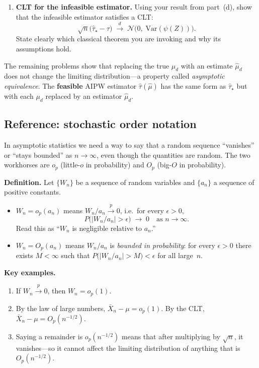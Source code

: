 \documentclass{article}
\newcommand{\Var}{\mathrm{Var}}
\newcommand{\op}{o_p}
\newcommand{\pconv}{\xrightarrow{p}}
\newcommand{\dconv}{\xrightarrow{d}}
\theoremstyle{definition}
\begin{document}
\begin{enumerate}
\begin{enumerate}
\item \textbf{CLT for the infeasible estimator.}
Using your result from part~(d), show that the infeasible estimator satisfies a CLT:
\[
  \sqrt{n}\bigl(\widehat{\tau}_\star - \tau\bigr)
  \;\dconv\;
  \mathcal{N}\!\bigl(0,\;\Var(\psi(Z))\bigr).
\]
State clearly which classical theorem you are invoking and why its
assumptions hold.

\end{enumerate}

\end{enumerate}

\bigskip

The remaining problems show that replacing the true $\mu_d$ with an estimate $\widehat{\mu}_d$ does not change the limiting distribution---a property called \emph{asymptotic equivalence}.  The \textbf{feasible} AIPW estimator $\widehat{\tau}(\widehat{\mu})$ has the same form as $\widehat{\tau}_\star$ but with each $\mu_d$ replaced by an estimator $\widehat{\mu}_d$.

\subsection*{Reference: stochastic order notation}

In asymptotic statistics we need a way to say that a random sequence
``vanishes'' or ``stays bounded'' as $n\to\infty$, even though the
quantities are random.  The two workhorses are $\op$ (little-$o$ in
probability) and $O_p$ (big-$O$ in probability).

\medskip
\textbf{Definition.}
Let $\{W_n\}$ be a sequence of random variables and $\{a_n\}$ a sequence
of positive constants.
\begin{itemize}[nosep]
  \item $W_n = \op(a_n)$ means
    $W_n/a_n \pconv 0$, i.e.\ for every $\epsilon>0$,
    \[
      P\!\bigl(|W_n/a_n|>\epsilon\bigr) \;\to\; 0
      \quad\text{as } n\to\infty.
    \]
    Read this as ``$W_n$ is negligible relative to $a_n$.''

  \item $W_n = O_p(a_n)$ means $W_n/a_n$ is
    \emph{bounded in probability}: for every $\epsilon>0$ there exists
    $M<\infty$ such that
    $P\!\bigl(|W_n/a_n|>M\bigr)<\epsilon$ for all large~$n$.
\end{itemize}

\medskip
\textbf{Key examples.}
\begin{enumerate}[nosep,label=(\roman*)]
  \item If $W_n\pconv 0$, then $W_n = \op(1)$.
  \item By the law of large numbers,
    $\bar{X}_n - \mu = \op(1)$.
    By the CLT, $\bar{X}_n - \mu = O_p(n^{-1/2})$.
  \item Saying a remainder is $\op(n^{-1/2})$ means that after
    multiplying by $\sqrt{n}$, it vanishes---so it cannot affect the
    limiting distribution of anything that is $O_p(n^{-1/2})$.
\end{enumerate}
\end{document}
